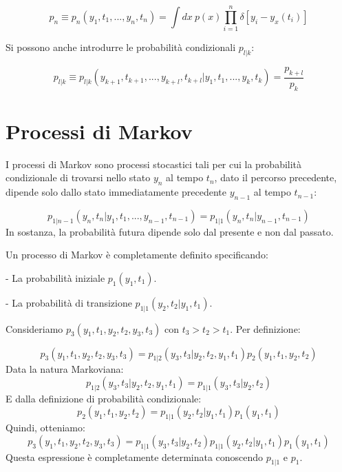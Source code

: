 \begin{equation}
p_n \equiv p_n(y_1, t_1, ..., y_n, t_n) = \int dx~p(x)\prod_{i=1}^{n}\delta[y_i - y_x(t_i)]
\end{equation}


Si possono anche introdurre le probabilità condizionali $p_{l|k}$:


\begin{equation}
p_{l|k} \equiv p_{l|k}(y_{k+1}, t_{k+1}, ..., y_{k+l}, t_{k+l} | y_1, t_1, ..., y_k, t_k) = \frac{p_{k+l}}{p_k}
\end{equation}


\section{Processi di Markov}

I processi di Markov sono processi stocastici tali per cui la probabilità condizionale di trovarsi nello stato $y_n$ al tempo $t_n$, dato il percorso precedente, dipende solo dallo stato immediatamente precedente $y_{n-1}$ al tempo $t_{n-1}$:


\begin{equation}
p_{1|n-1}(y_n, t_n | y_1, t_1, ..., y_{n-1}, t_{n-1}) = p_{1|1}(y_n, t_n | y_{n-1}, t_{n-1})
\end{equation}
In sostanza, la probabilità futura dipende solo dal presente e non dal passato.

\noindent Un processo di Markov è completamente definito specificando:

- La probabilità iniziale $p_1(y_1, t_1)$.

- La probabilità di transizione $p_{1|1}(y_2, t_2 | y_1, t_1)$.

\noindent Consideriamo $p_3(y_1, t_1, y_2, t_2, y_3, t_3)$ con $t_3 > t_2 > t_1$. Per definizione:

\begin{equation}
p_3(y_1, t_1, y_2, t_2, y_3, t_3) = p_{1|2}(y_3, t_3 | y_2, t_2, y_1, t_1) p_2(y_1, t_1, y_2, t_2)
\end{equation}
Data la natura Markoviana:
\begin{equation}
p_{1|2}(y_3, t_3 | y_2, t_2, y_1, t_1) = p_{1|1}(y_3, t_3 | y_2, t_2)
\end{equation}
E dalla definizione di probabilità condizionale:
\begin{equation}
p_2(y_1, t_1, y_2, t_2) = p_{1|1}(y_2, t_2 | y_1, t_1) p_1(y_1, t_1)
\end{equation}
Quindi, otteniamo:
\begin{equation}
p_3(y_1, t_1, y_2, t_2, y_3, t_3) = p_{1|1}(y_3, t_3 | y_2, t_2) p_{1|1}(y_2, t_2 | y_1, t_1) p_1(y_1, t_1)
\end{equation}
Questa espressione è completamente determinata conoscendo $p_{1|1}$ e $p_1$.

